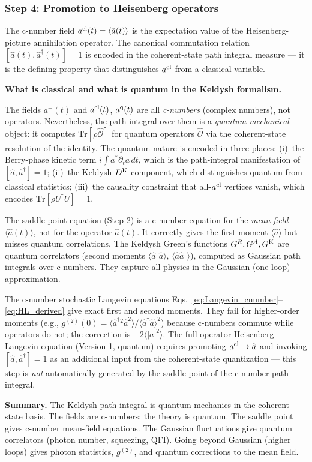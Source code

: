 \documentclass[12pt]{article}
\newcommand{\cl}{{\rm cl}}
\newcommand{\Keldysh}{{\rm K}}
\begin{document}
\subsubsection*{Step 4: Promotion to Heisenberg operators}

The c-number field $a^\cl(t) = \langle\hat{a}(t)\rangle$ is the
expectation value of the Heisenberg-picture annihilation operator.
The canonical commutation relation $[\hat{a}(t),\hat{a}^\dagger(t)]=1$
is encoded in the coherent-state path integral measure --- it is the
defining property that distinguishes $a^\cl$ from a classical variable.

\begin{remark}
\textbf{What is classical and what is quantum in the Keldysh formalism.}

The fields $a^\pm(t)$ and $a^{\rm cl}(t)$, $a^{\rm q}(t)$ are all
\emph{c-numbers} (complex numbers), not operators.  Nevertheless,
the path integral over them is a \emph{quantum mechanical} object: it
computes $\mathrm{Tr}[\rho\hat{\mathcal{O}}]$ for quantum operators
$\hat{\mathcal{O}}$ via the coherent-state resolution of the identity.
The quantum nature is encoded in three places:
(i)~the Berry-phase kinetic term $i\int a^*\partial_t a\,dt$, which
is the path-integral manifestation of $[\hat{a},\hat{a}^\dagger]=1$;
(ii)~the Keldysh $D^\Keldysh$ component, which distinguishes quantum
from classical statistics;
(iii)~the causality constraint that all-$a^{\rm cl}$ vertices vanish,
which encodes $\mathrm{Tr}[\rho U^\dagger U]=1$.

The saddle-point equation (Step 2) is a c-number equation for the
\emph{mean field} $\langle\hat{a}(t)\rangle$, not for the operator
$\hat{a}(t)$.  It correctly gives the first moment $\langle\hat{a}\rangle$
but misses quantum correlations.  The Keldysh Green's functions
$G^R, G^A, G^\Keldysh$ are quantum correlators (second moments
$\langle\hat{a}^\dagger\hat{a}\rangle$, $\langle\hat{a}\hat{a}^\dagger\rangle$),
computed as Gaussian path integrals over c-numbers.  They capture all
physics in the Gaussian (one-loop) approximation.

The c-number stochastic Langevin equations
Eqs.~\eqref{eq:Langevin_cnumber}--\eqref{eq:HL_derived} give exact
first and second moments.  They fail for higher-order moments
(e.g., $g^{(2)}(0)=\langle\hat{a}^\dagger{}^2\hat{a}^2\rangle/
\langle\hat{a}^\dagger\hat{a}\rangle^2$) because c-numbers commute
while operators do not; the correction is $-2\langle|a|^2\rangle$.
The full operator Heisenberg-Langevin equation (Version 1, quantum)
requires promoting $a^\cl\to\hat{a}$ and
invoking $[\hat{a},\hat{a}^\dagger]=1$ as an additional input from
the coherent-state quantization --- this step is \emph{not}
automatically generated by the saddle-point of the c-number path
integral.

\textbf{Summary.}  The Keldysh path integral is quantum mechanics in
the coherent-state basis.  The fields are c-numbers; the theory is
quantum.  The saddle point gives c-number mean-field equations.
The Gaussian fluctuations give quantum correlators (photon number,
squeezing, QFI).  Going beyond Gaussian (higher loops) gives photon
statistics, $g^{(2)}$, and quantum corrections to the mean field.
\end{remark}
\end{document}
